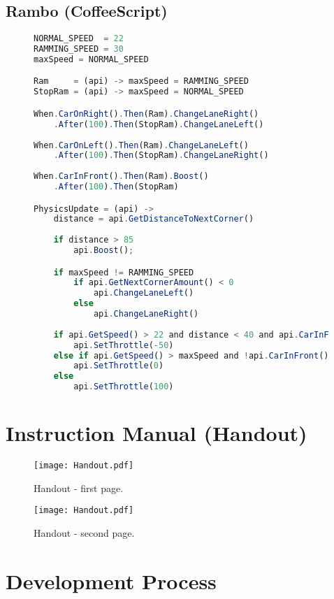 \subsection{Rambo (CoffeeScript)}
\label{coffeerambo}
\begin{figure}[H]
\begin{lstlisting}[language=JavaScript]
NORMAL_SPEED  = 22
RAMMING_SPEED = 30
maxSpeed = NORMAL_SPEED

Ram     = (api) -> maxSpeed = RAMMING_SPEED
StopRam = (api) -> maxSpeed = NORMAL_SPEED

When.CarOnRight().Then(Ram).ChangeLaneRight()
    .After(100).Then(StopRam).ChangeLaneLeft()
    
When.CarOnLeft().Then(Ram).ChangeLaneLeft()
    .After(100).Then(StopRam).ChangeLaneRight()
    
When.CarInFront().Then(Ram).Boost()
    .After(100).Then(StopRam)

PhysicsUpdate = (api) -> 
    distance = api.GetDistanceToNextCorner() 
    
    if distance > 85
        api.Boost(); 

    if maxSpeed != RAMMING_SPEED 
        if api.GetNextCornerAmount() < 0 
            api.ChangeLaneLeft() 
        else
            api.ChangeLaneRight()
    
    if api.GetSpeed() > 22 and distance < 40 and api.CarInFront() 
        api.SetThrottle(-50) 
    else if api.GetSpeed() > maxSpeed and !api.CarInFront() 
        api.SetThrottle(0) 
    else
        api.SetThrottle(100)
\end{lstlisting}
\end{figure}

\section{Instruction Manual (Handout)}

\begin{figure}[H]
\centering
\texttt{[image: Handout.pdf]}
\caption{Handout - first page.}
\end{figure}
\begin{figure}[H]
\centering
\texttt{[image: Handout.pdf]}
\caption{Handout - second page.}
\end{figure}

\section{Development Process}

